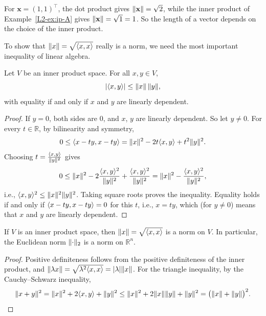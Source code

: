 \begin{example}
    For $\mathbf{x} = (1, 1)^\top$, the dot product gives $\lVert \mathbf{x} \rVert = \sqrt{2}$, while the inner product of Example~\ref{L2-ex:ip-A} gives $\lVert \mathbf{x} \rVert = \sqrt{1} = 1$. So the length of a vector depends on the choice of the inner product.
\end{example}

To show that $\lVert x \rVert = \sqrt{\langle x, x \rangle}$ really is a norm, we need the most important inequality of linear algebra.

\begin{theorem}\label{L2-thm:cauchy-schwarz}
    Let $V$ be an inner product space. For all $x, y \in V$,
    \[|\langle x, y \rangle| \leq \lVert x \rVert \, \lVert y \rVert,\]
    with equality if and only if $x$ and $y$ are linearly dependent.
\end{theorem}

\begin{proof}
    If $y = 0$, both sides are $0$, and $x$, $y$ are linearly dependent. So let $y \neq 0$. For every $t \in \mathbb{R}$, by bilinearity and symmetry,
    \[0 \leq \langle x - ty, x - ty \rangle = \lVert x \rVert^2 - 2t \langle x, y \rangle + t^2 \lVert y \rVert^2.\]
    Choosing $t = \frac{\langle x, y \rangle}{\lVert y \rVert^2}$ gives
    \[0 \leq \lVert x \rVert^2 - 2\frac{\langle x, y \rangle^2}{\lVert y \rVert^2} + \frac{\langle x, y \rangle^2}{\lVert y \rVert^2} = \lVert x \rVert^2 - \frac{\langle x, y \rangle^2}{\lVert y \rVert^2},\]
    i.e., $\langle x, y \rangle^2 \leq \lVert x \rVert^2 \lVert y \rVert^2$. Taking square roots proves the inequality. Equality holds if and only if $\langle x - ty, x - ty \rangle = 0$ for this $t$, i.e., $x = ty$, which (for $y \neq 0$) means that $x$ and $y$ are linearly dependent.
\end{proof}

\begin{corollary}\label{L2-cor:induced-norm}
    If $V$ is an inner product space, then $\lVert x \rVert = \sqrt{\langle x, x \rangle}$ is a norm on $V$. In particular, the Euclidean norm $\lVert \cdot \rVert_2$ is a norm on $\mathbb{R}^n$.
\end{corollary}

\begin{proof}
    Positive definiteness follows from the positive definiteness of the inner product, and $\lVert \lambda x \rVert = \sqrt{\lambda^2 \langle x, x \rangle} = |\lambda| \lVert x \rVert$. For the triangle inequality, by the Cauchy--Schwarz inequality,
    \[\lVert x + y \rVert^2 = \lVert x \rVert^2 + 2 \langle x, y \rangle + \lVert y \rVert^2 \leq \lVert x \rVert^2 + 2 \lVert x \rVert \lVert y \rVert + \lVert y \rVert^2 = \big(\lVert x \rVert + \lVert y \rVert\big)^2. \qedhere\]
\end{proof}

